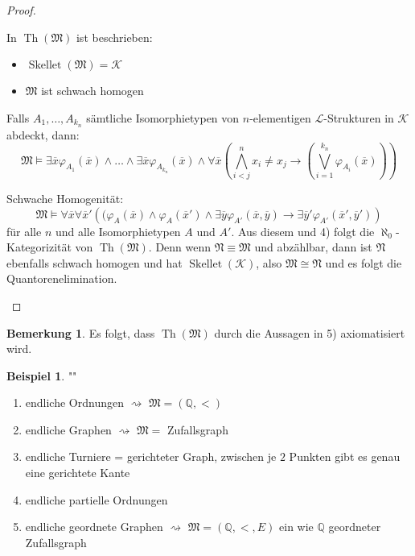 \documentclass[12pt,parskip=full]{scrartcl}
\newcommand{\setQ}{\mathbb{Q}}
\theoremstyle{definition}
\newtheorem{example}[theorem]{Beispiel}
\newtheorem{remark}[theorem]{Bemerkung}
\begin{document}
\begin{proof}
\begin{enumerate}
			In $\operatorname{Th}(\mathfrak{M})$ ist beschrieben:
			\begin{itemize}
				\item $\operatorname{Skellet}(\mathfrak{M}) = \mathcal{K}$
				\item $\mathfrak{M}$ ist schwach homogen
			\end{itemize}
		
			Falls $A_1, \dots, A_{k_n}$ sämtliche Isomorphietypen von $n$-elementigen $\mathcal{L}$-Strukturen in $\mathcal{K}$ abdeckt, dann:
			\begin{equation*}
				\mathfrak{M} \models \exists \overline{x} \varphi_{A_1}(\overline{x}) \land \dots \land \exists \overline{x} \varphi_{A_{k_n}}(\overline{x}) \land \forall \overline{x}( \bigwedge_{i < j}^n x_i \neq x_j \rightarrow (\bigvee_{i=1}^{k_n} \varphi_{A_i} (\overline{x}) ) )
			\end{equation*}
			
			Schwache Homogenität:
			\begin{equation*}
				\mathfrak{M} \models \forall \overline{x} \forall \overline{x}' \left( (\varphi_A(\overline{x}) \land \varphi_A(\overline{x}') \land \exists \overline{y} \varphi_{A'}(\overline{x}, \overline{y}) \rightarrow \exists \overline{y}'  \varphi_{A'}(\overline{x}', \overline{y}') \right)
			\end{equation*}
			für alle $n$ und alle Isomorphietypen $A$ und $A'$. Aus diesem und 4) folgt die $\aleph_0$-Kategorizität von $\operatorname{Th}(\mathfrak{M})$. Denn wenn $\mathfrak{N} \equiv \mathfrak{M}$ und abzählbar, dann ist $\mathfrak{N}$ ebenfalls schwach homogen und hat $\operatorname{Skellet}(\mathcal{K})$, also $\mathfrak{M} \cong \mathfrak{N}$ und es folgt die Quantorenelimination.
		\end{enumerate}
	\end{proof}

	\begin{remark}
		Es folgt, dass $\operatorname{Th}(\mathfrak{M})$ durch die Aussagen in 5) axiomatisiert wird.
	\end{remark}

	\begin{example}""
		\begin{enumerate}
			\item endliche Ordnungen $\rightsquigarrow$ $\mathfrak{M} = (\setQ, <)$
			\item endliche Graphen $\rightsquigarrow$ $\mathfrak{M} = $ Zufallsgraph
			\item endliche Turniere = gerichteter Graph, zwischen je $2$ Punkten gibt es genau eine gerichtete Kante
			\item endliche partielle Ordnungen
			\item endliche geordnete Graphen $\rightsquigarrow$ $\mathfrak{M} = (\setQ, <, E)$ ein wie $\setQ$ geordneter Zufallsgraph
		\end{enumerate}
	\end{example}
	
\end{document}
